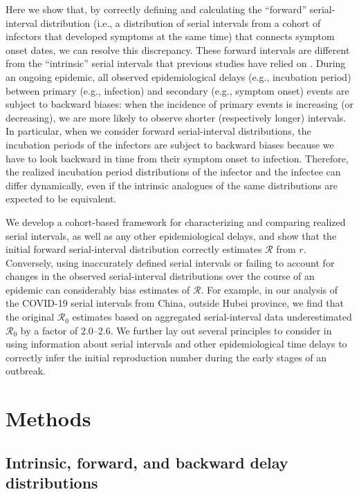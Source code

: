 \documentclass[12pt]{article}
\newcommand{\Rx}[1]{\ensuremath{{\mathcal R}_{#1}}\xspace}
\newcommand{\Ro}{\Rx{0}}
\newcommand{\RR}{\ensuremath{{\mathcal R}}\xspace}
\begin{document}
Here we show that, by correctly defining and calculating the ``forward'' serial-interval distribution (i.e., a distribution of serial intervals from a cohort of infectors that developed symptoms at the same time) that connects symptom onset dates, we can resolve this discrepancy.
These forward intervals are different from the ``intrinsic'' serial intervals that previous studies have relied on \citep{svensson2007note,klinkenberg2011correlation,te2013estimating,champredon2018equivalence, britton2019estimation}.
During an ongoing epidemic, all observed epidemiological delays (e.g., incubation period) between primary (e.g., infection) and secondary (e.g., symptom onset) events are subject to backward biases: when the incidence of primary events is increasing (or decreasing), we are more likely to observe shorter (respectively longer) intervals.
In particular, when we consider forward serial-interval distributions, the incubation periods of the infectors are subject to backward biases because we have to look backward in time from their symptom onset to infection.
Therefore, the realized incubation period distributions of the infector and the infectee can differ dynamically, even if the intrinsic analogues of the same distributions are expected to be equivalent.

We develop a cohort-based framework for characterizing and comparing realized serial intervals, as well as any other epidemiological delays, and show that the initial forward serial-interval distribution correctly estimates \RR from $r$.
Conversely, using inaccurately defined serial intervals or failing to account for changes in the observed serial-interval distributions over the course of an epidemic can considerably bias estimates of \RR.
For example, in our analysis of the COVID-19 serial intervals from China, outside Hubei province, we find that the original \Ro estimates based on aggregated serial-interval data underestimated \Ro by a factor of 2.0--2.6.
We further lay out several principles to consider in using information about serial intervals and other epidemiological time delays to correctly infer the initial reproduction number during the early stages of an outbreak.

\section{Methods}

\subsection{Intrinsic, forward, and backward delay distributions}
\end{document}
